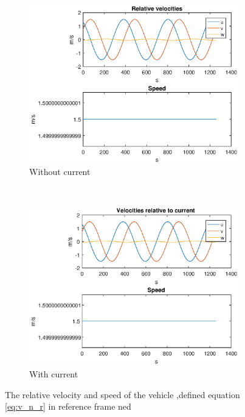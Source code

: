 \begin{figure}[!ht]
	\centering
	\begin{subfigure}[b]{0.45\textwidth}
		\includegraphics[width=\textwidth]{figures/4_vel}
		\caption{Without current}
	\end{subfigure}
	~ %
	\begin{subfigure}[b]{0.45\textwidth}
		\includegraphics[width=\textwidth]{figures/4_vel_current}
		\caption{With current}
	\end{subfigure}
	\caption{The relative velocity and speed of the vehicle ,defined equation \eqref{eq:v_n_r}  in reference frame ned}
	\label{fig:4_vel}
\end{figure}

